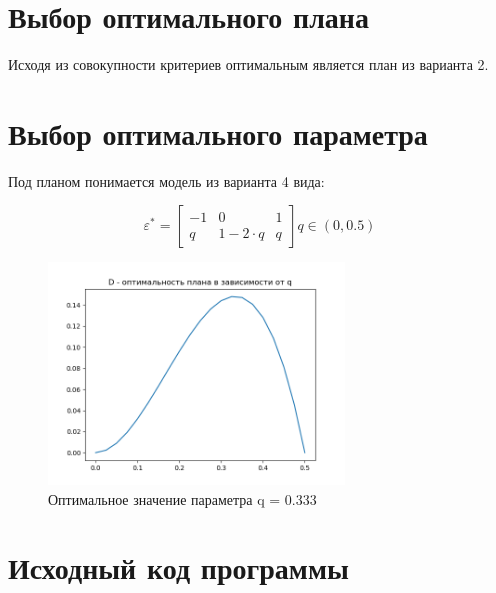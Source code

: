 \section{Выбор оптимального плана}



Исходя из совокупности критериев оптимальным является план из варианта 2.


\section{Выбор оптимального параметра}

Под планом понимается модель из варианта 4 вида:

\[
	\varepsilon^*=
	\begin{bmatrix}
	    -1		& 		 0		 & 		1		\\
 	     q		& 1 - 2\cdot q &		q
	\end{bmatrix}
	q \in (0, 0.5)
\] 


\begin{figure}[!htb] %
	\centering
	\includegraphics[width=0.7\textwidth]{opt_q.png}
	\caption{Оптимальное значение параметра q = 0.333}
\end{figure}



\section{Исходный код программы}
